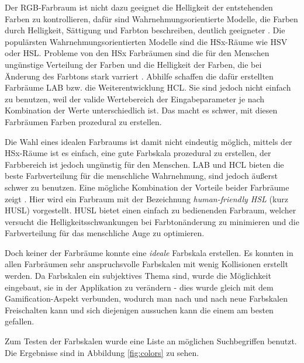 \documentclass[12pt,twoside]{book}
\begin{document}
Der RGB-Farbraum ist nicht dazu geeignet die Helligkeit der entstehenden Farben zu kontrollieren, dafür sind Wahrnehmungsorientierte Modelle, die Farben durch Helligkeit, Sättigung und Farbton beschreiben, deutlich geeigneter \cite{meier2004interactive}. Die populärsten Wahrnehmungsorientierten Modelle sind die HSx-Räume wie HSV oder HSL.
Probleme von den HSx Farbräumen sind die für den Menschen ungünstige Verteilung der Farben und die Helligkeit der Farben, die bei Änderung des Farbtons stark varriert \cite{husl}.
Abhilfe schaffen die dafür erstellten Farbräume LAB bzw. die Weiterentwicklung HCL. Sie sind jedoch nicht einfach zu benutzen, weil der valide Wertebereich der Eingabeparameter je nach Kombination der Werte unterschiedlich ist. Das macht es schwer, mit diesen Farbräumen Farben prozedural zu erstellen.

Die Wahl eines idealen Farbraums ist damit nicht eindeutig möglich, mittels der HSx-Räume ist es einfach, eine gute Farbskala prozedural zu erstellen, der Farbbereich ist jedoch ungünstig für den Menschen. LAB und HCL bieten die beste Farbverteilung für die menschliche Wahrnehmung, sind jedoch äußerst schwer zu benutzen. Eine mögliche Kombination der Vorteile beider Farbräume zeigt \citep{husl}. Hier wird ein Farbraum mit der Bezeichnung \textit{human-friendly HSL} (kurz HUSL) vorgestellt. HUSL bietet einen einfach zu bedienenden Farbraum, welcher versucht die Helligkeitsschwankungen bei Farbtonänderung zu minimieren und die Farbverteilung für das menschliche Auge zu optimieren.

Doch keiner der Farbräume konnte eine \textit{ideale} Farbskala erstellen. Es konnten in allen Farbräumen sehr anspruchsvolle Farbskalen mit wenig Kollisionen erstellt werden. Da Farbskalen ein subjektives Thema sind, wurde die Möglichkeit eingebaut, sie in der Applikation zu verändern - dies wurde gleich mit dem Gamification-Aspekt verbunden, wodurch man nach und nach neue Farbskalen Freischalten kann und sich diejenigen aussuchen kann die einem am besten gefallen.

Zum Testen der Farbskalen wurde eine Liste an möglichen Suchbegriffen benutzt. Die Ergebnisse sind in Abbildung \ref{fig:colors} zu sehen.
\end{document}
